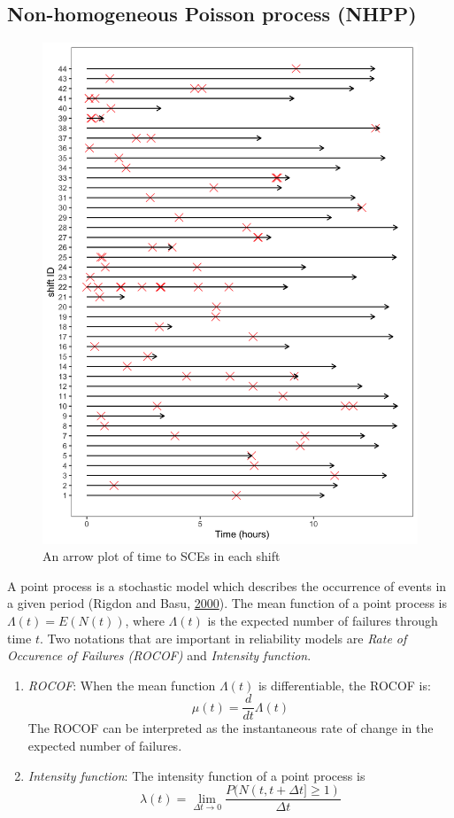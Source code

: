 \documentclass[12pt]{book}
\numberwithin{equation}{chapter}
\begin{document}
\hypertarget{non-homogeneous-poisson-process-nhpp}{%
\subsection{Non-homogeneous Poisson process (NHPP)}\label{non-homogeneous-poisson-process-nhpp}}

\begin{figure}[ht]

{\centering \includegraphics[width=0.5\linewidth]{figs/NHPP_arrow_plot} 

}

\caption{An arrow plot of time to SCEs in each shift}\label{fig:arrowplot}
\end{figure}

A point process is a stochastic model which describes the occurrence of events in a given period (Rigdon and Basu, \protect\hyperlink{ref-rigdon2000statistical}{2000}). The mean function of a point process is \(\Lambda(t) = E(N(t))\), where \(\Lambda(t)\) is the expected number of failures through time \(t\). Two notations that are important in reliability models are \emph{Rate of Occurence of Failures (ROCOF)} and \emph{Intensity function}.

\begin{enumerate}
\def\labelenumi{\arabic{enumi}.}
\item
  \emph{ROCOF}: When the mean function \(\Lambda(t)\) is differentiable, the ROCOF is:
  \[\mu(t) = \frac{d}{dt}\Lambda(t)\]
  The ROCOF can be interpreted as the instantaneous rate of change in the expected number of failures.
\item
  \emph{Intensity function}: The intensity function of a point process is
  \[\lambda(t) = \lim_{\Delta t \rightarrow 0}\frac{P(N(t, t+\Delta t] \geq 1)}{\Delta t}\]
\end{enumerate}
\end{document}

